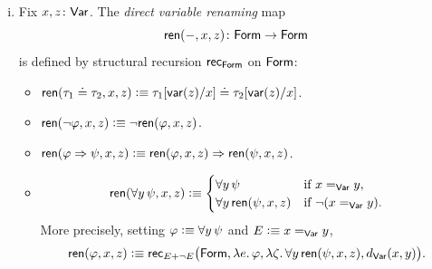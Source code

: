 \begin{defns}
\begin{enumerate}[i),font=\upshape]
\begin{itemize}
        \item $0[t/x]\defeq 0$.
        
        \item $s(\tau)[t/x]\defeq s(\tau[t/x])$.
        
        \item $(\tau_1+\tau_2)[t/x]\defeq\tau_1[t/x]+\tau_2[t/x]$.
        
        \item $(\tau_1\cdot\tau_2)[t/x]\defeq\tau_1[t/x]\cdot\tau_2[t/x]$.
        \end{itemize}
        
        \item Fix $x,z\colon\fun{Var}$. The \textsl{direct variable renaming} map
        \[
            \fun{ren}(\dummy,x,z)\colon
                \fun{Form}\to\fun{Form}
        \]
        is defined by structural recursion $\mathsf{rec}_{\mathsf{Form}}$ on $\mathsf{Form}$:
        \begin{itemize}
            \item $\mathsf{ren}(\tau_1\doteq\tau_2,x,z)\mathrel{\vcentcolon}\equiv\tau_1[\mathsf{var}(z)/x]\doteq\tau_2[\mathsf{var}(z)/x]$.
            
            \item $\mathsf{ren}(\neg\varphi,x,z)\mathrel{\vcentcolon}\equiv\neg\mathsf{ren}(\varphi,x,z)$.
            
            \item $\mathsf{ren}(\varphi\mathrel{\Rightarrow}\psi,x,z)\mathrel{\vcentcolon}\equiv\mathsf{ren}(\varphi,x,z)\mathrel{\Rightarrow}\mathsf{ren}(\psi,x,z)$.
            
            \item
            \[
                \mathsf{ren}(\forall y\,\psi,x,z)\mathrel{\vcentcolon}\equiv
                \begin{cases}
                    \forall y\,\psi
                        &\text{if }x\mathrel{=_{\mathsf{Var}}}y,\\
                    \forall y\,\mathsf{ren}(\psi,x,z)
                        &\text{if }\neg(x\mathrel{=_{\mathsf{Var}}}y).
                \end{cases}
            \]
            More precisely, setting $\varphi\mathrel{\vcentcolon}\equiv\forall y\,\psi$ and $E\mathrel{\vcentcolon}\equiv x\mathrel{=_{\mathsf{Var}}}y$,
            \[
                \mathsf{ren}(\varphi,x,z)\mathrel{\vcentcolon}\equiv
                    \mathsf{rec}_{E+\neg E}\bigl(
                        \mathsf{Form},
                        \lambda e.\,\varphi,
                        \lambda\zeta.\,\forall y\,\mathsf{ren}(\psi,x,z),
                        d_{\mathsf{Var}}(x,y)
                    \bigr).
            \]
        \end{itemize}
    \end{enumerate}
\end{defns}

